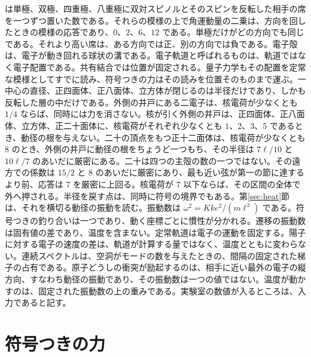 \documentclass[a4paper]{article}
\begin{document}
は単極、双極、四重極、八重極に双対スピノルとそのスピンを反転した相手の席を一つずつ置いた数である。それらの模様の上で角運動量の二乗は、方向を回したときの模様の応答であり、\(0\)、\(2\)、\(6\)、\(12\) である。単極だけがどの方向でも同じである。それより高い席は、ある方向では正、別の方向では負である。電子殻は、電子が動き回れる球状の溝である。電子軌道と呼ばれるものは、軌道ではなく電子配置である。共有結合では位置が固定される。量子力学もその配置を定常な模様としてすでに読み、符号つきの力はその読みを位置そのものまで運ぶ。一中心の直径、正四面体、正八面体、立方体が閉じるのは半径だけであり、しかも反転した層の中だけである。外側の井戸にある二電子は、核電荷が少なくとも \(1/4\) ならば、同時には力を消さない。核が引く外側の井戸は、正四面体、正八面体、立方体、正二十面体に、核電荷がそれぞれ少なくとも \(1\)、\(2\)、\(3\)、\(5\) であるとき、動径の根を与えない。二十の頂点をもつ正十二面体は、核電荷が少なくとも \(8\) のとき、外側の井戸に動径の根をちょうど一つもち、その半径は \(7\ell/10\) と \(10\ell/7\) のあいだに厳密にある。二十は四つの主殻の数の一つではない。その遠方での係数は \(15/2\) と \(8\) のあいだに厳密にあり、最も近い弦が第一の節に達するより前、応答は \(7\) を厳密に上回る。核電荷が \(7\) 以下ならば、その区間の全体で外へ押される。半径を戻す点は、同時に符号の境界でもある。第\ref{sec:heat}節は、それを横切る動径の振動を読む。振動数は \(\omega^{2}=K k e^{2}/(m\ell^{3})\) である。符号つきの釣り合いは一つであり、動く座標ごとに慣性が分かれる。遷移の振動数は固有値の差であり、温度を含まない。定常軌道は電子の運動を固定する。陽子に対する電子の速度の差は、軌道が計算する量ではなく、温度とともに変わらない。連続スペクトルは、空洞がモードの数を与えたときの、間隔の固定された梯子の占有である。原子どうしの衝突が励起するのは、相手に近い最外の電子の縦方向、すなわち動径の振動であり、その振動数は一つの値ではない。温度が動かすのは、固定された振動数の上の重みである。実験室の数値が入るところは、入力であると記す。

\section{符号つきの力}
\label{sec:force}
\end{document}
